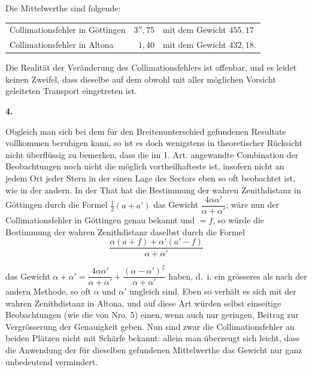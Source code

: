 Die Mittelwerthe sind folgende:
\begin{center}
\begin{tabular}{@{}l@{\qquad}r@{\enspace}l@{}}
Collimationsfehler in Göttingen & \(3''{,}75\) & mit dem Gewicht \(455{,}17\)\\
Collimationsfehler in Altona & \(1{,}40\) & mit dem Gewicht \(432{,}18\).
\end{tabular}
\end{center}

Die Realität der Veränderung des Collimationsfehlers ist offenbar, und
es leidet keinen Zweifel, dass dieselbe auf dem obwohl mit aller möglichen
Vorsicht geleiteten Transport eingetreten ist.

\begin{center}\textbf{4.}\end{center}

Obgleich man sich bei dem für den Breitenunterschied gefundenen
Resultate vollkommen beruhigen kann, so ist es doch wenigstens in theoretischer
Rücksicht nicht überflüssig zu bemerken, dass die im 1. Art. angewandte
Combination der Beobachtungen noch nicht die möglich vortheilhafteste ist,
insofern nicht an jedem Ort jeder Stern in der einen Lage des Sectors eben so
oft beobachtet ist, wie in der andern. In der That hat die Bestimmung der
wahren Zenithdistanz in Göttingen durch die Formel \(\tfrac12(a+a')\) das Gewicht
\(\dfrac{4\alpha\alpha'}{\alpha+\alpha'}\); wäre nun der Collimationsfehler in Göttingen genau
bekannt und \(=f\),
so würde die Bestimmung der wahren Zenithdistanz daselbst durch die Formel
\[
\frac{\alpha(a+f)+\alpha'(a'-f)}{\alpha+\alpha'}
\]

\par\clearpage
\noindent\makebox[12mm][l]{}\par\medskip

\noindent das Gewicht \(\alpha+\alpha'=\dfrac{4\alpha\alpha'}{\alpha+\alpha'}+
\dfrac{(\alpha-\alpha')^2}{\alpha+\alpha'}\) haben, d.\ i. ein grösseres als nach der
andern Methode, so oft \(\alpha\) und \(\alpha'\) ungleich sind. Eben so verhält es sich mit
der wahren Zenithdistanz in Altona, und auf diese Art würden selbst einseitige
Beobachtungen (wie die von Nro. 5) einen, wenn auch nur geringen,
Beitrag zur Vergrösserung der Genauigkeit geben. Nun sind zwar die Collimationsfehler
an beiden Plätzen nicht mit  Schärfe bekannt: allein
man überzeugt sich leicht, dass die Anwendung der für dieselben gefundenen
Mittelwerthe das Gewicht nur ganz unbedeutend vermindert.

